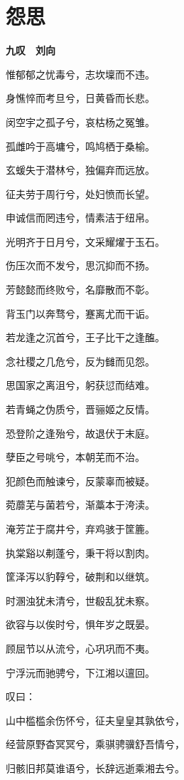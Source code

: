 \documentclass[12pt,a4paper]{ctexbook}
\begin{document}
\section{怨思}
\textbf{九叹　刘向}\par\vspace{0.5em}
惟郁郁之忧毒兮，志坎壈而不违。\par
身憔悴而考旦兮，日黄昏而长悲。\par
闵空宇之孤子兮，哀枯杨之冤雏。\par
孤雌吟于高墉兮，鸣鸠栖于桑榆。\par
玄蝯失于潜林兮，独偏弃而远放。\par
征夫劳于周行兮，处妇愤而长望。\par
申诚信而罔违兮，情素洁于纽帛。\par
光明齐于日月兮，文采耀燿于玉石。\par
伤压次而不发兮，思沉抑而不扬。\par
芳懿懿而终败兮，名靡散而不彰。\par
背玉门以奔骛兮，蹇离尤而干诟。\par
若龙逢之沉首兮，王子比干之逢醢。\par
念社稷之几危兮，反为雠而见怨。\par
思国家之离沮兮，躬获愆而结难。\par
若青蝇之伪质兮，晋骊姬之反情。\par
恐登阶之逢殆兮，故退伏于末庭。\par
孽臣之号咷兮，本朝芜而不治。\par
犯颜色而触谏兮，反蒙辜而被疑。\par
菀蘼芜与菌若兮，渐藁本于洿渎。\par
淹芳芷于腐井兮，弃鸡骇于筐簏。\par
执棠谿以刜蓬兮，秉干将以割肉。\par
筐泽泻以豹鞟兮，破荆和以继筑。\par
时溷浊犹未清兮，世殽乱犹未察。\par
欲容与以俟时兮，惧年岁之既晏。\par
顾屈节以从流兮，心巩巩而不夷。\par
宁浮沅而驰骋兮，下江湘以邅回。\par
叹曰：\par
山中槛槛余伤怀兮，征夫皇皇其孰依兮，\par
经营原野杳冥冥兮，乘骐骋骥舒吾情兮，\par
归骸旧邦莫谁语兮，长辞远逝乘湘去兮。\par
\end{document}
